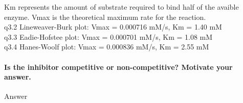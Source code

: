 \documentclass[a4paper,12pt]{article}
\begin{document}
Km represents the amount of substrate required to bind half of the avaible enzyme.
Vmax is the theoretical maximum rate for the reaction.\\

q3.2 Lineweaver-Burk plot: Vmax = 0.000716 mM/s, Km = 1.40 mM\\
q3.3 Eadie-Hofstee plot: Vmax = 0.000701 mM/s, Km = 1.08 mM\\
q3.4 Hanes-Woolf plot: Vmax = 0.000836 mM/s, Km = 2.55 mM\\

\paragraph{Is the inhibitor competitive or non-competitive? Motivate your answer.}

Answer\\
\end{document}
